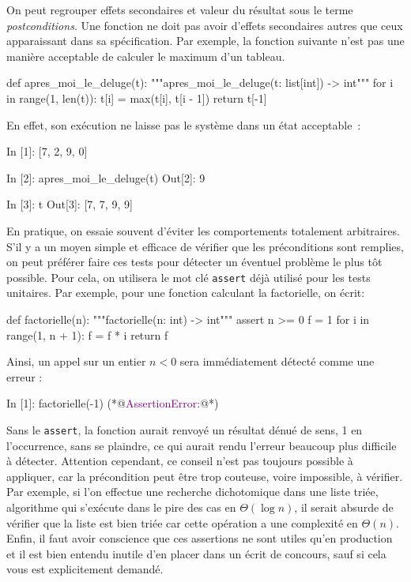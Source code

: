 \documentclass{magnolia}
\begin{document}
\vspace{2ex}
\begin{remarques}
  \remarque On peut regrouper \og effets secondaires \fg et \og valeur du résultat \fg 
  sous le terme
  \emph{postconditions}.
  \remarque Une fonction ne doit pas avoir d'effets secondaires autres que
  ceux apparaissant dans sa spécification. Par exemple, la fonction
  suivante n'est pas une manière acceptable de calculer le maximum
  d'un tableau.
\begin{pythoncodeline}
def apres_moi_le_deluge(t):
    """apres_moi_le_deluge(t: list[int]) -> int"""
    for i in range(1, len(t)):
        t[i] = max(t[i], t[i - 1])
    return t[-1]
\end{pythoncodeline}
En effet, son exécution ne laisse pas le système dans un état acceptable~:
\begin{pythoncode}
In [1]: [7, 2, 9, 0]

In [2]: apres_moi_le_deluge(t)
Out[2]: 9

In [3]: t
Out[3]: [7, 7, 9, 9]
\end{pythoncode}
  \remarque En pratique, on essaie souvent d'éviter les comportements totalement
  arbitraires. S'il y a un moyen simple et efficace de vérifier que
  les préconditions sont remplies, on peut préférer faire ces tests pour
  détecter un éventuel problème le plus tôt possible.
  Pour cela, on utilisera le mot clé \verb!assert! déjà utilisé pour les tests unitaires.
  Par exemple, pour une fonction calculant la factorielle, on écrit:
\begin{pythoncodeline}
def factorielle(n):
    """factorielle(n: int) -> int"""
    assert n >= 0
    f = 1
    for i in range(1, n + 1):
        f = f * i
    return f
\end{pythoncodeline}
  Ainsi, un appel sur un entier $n < 0$ sera immédiatement détecté comme une
  erreur :
\begin{pythoncode}
In [1]: factorielle(-1)
(*@\textcolor{purple}{AssertionError:}@*)
\end{pythoncode}
  Sans le \verb!assert!, la fonction aurait renvoyé un résultat dénué de sens,
  1 en l'occurrence, sans se plaindre, ce qui aurait rendu l'erreur
  beaucoup plus difficile à détecter.
  \remarque Attention cependant, ce conseil n'est pas toujours possible à
  appliquer, car la précondition peut être trop couteuse, voire impossible, à
  vérifier. Par exemple, si l'on effectue une recherche dichotomique dans une liste triée, algorithme
  qui s'exécute dans le pire des cas en $\Theta(\log n)$, il serait absurde de
  vérifier que la liste est bien triée  car cette opération
  a une complexité en $\Theta(n)$. Enfin, il faut avoir conscience que ces assertions
  ne sont utiles qu'en \og production \fg et il est bien entendu inutile d'en placer dans
  un écrit de concours, sauf si cela vous est explicitement demandé.
\end{remarques}
\end{document}
